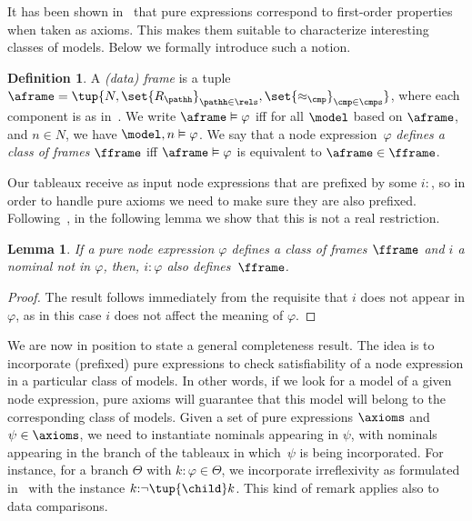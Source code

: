 \documentclass[10pt,a4paper]{amsart}
\newtheorem{lem}[thm]{Lemma}
\theoremstyle{definition}
\newtheorem{defi}[thm]{Definition}
\theoremstyle{remark}
\begin{document}
It has been shown in~\cite{ArecesF21} that pure expressions correspond to first-order properties when taken as axioms. This makes them suitable to characterize interesting classes of models. Below we formally introduce such a notion.

\begin{defi}
    A \emph{(data) frame} is a tuple $\aframe = \tup{N, \set{R_\pathh}_{\pathh \in \rels}, \set{\approx_{\cmp}}_{\cmp\in\cmps}}$, where each component is as in~.
    We write $\aframe\vDash\varphi$ iff for all $\model$ based on $\aframe$, and $n \in N$, we have $\model,n \vDash \varphi$.
    We say that a node expression~$\varphi$ \emph{defines a class of frames $\fframe$} iff $\aframe\vDash\varphi$ is equivalent to  $\aframe\in\fframe$. 
\end{defi}

Our tableaux receive as input node expressions that are prefixed by some $i{:}$, so in order to handle pure axioms we need to make sure they are also prefixed. Following~\cite{Blackburn00,Blackburn2002BeyondPA}, in the following lemma we show that this is not a real restriction.

\begin{lem}\label{lemma:defines}
 If a pure node expression $\varphi$ defines a class of frames $\fframe$ and $i$ a nominal not in $\varphi$, then, $i{:}\varphi$ also defines~$\fframe$.
\end{lem}
\begin{proof}
    The result follows immediately from the requisite that $i$ does not appear in $\varphi$, as in this case $i$ does not affect the meaning of $\varphi$.
\end{proof}

We are now in position to state a general completeness result. The idea is to incorporate (prefixed) pure expressions to check satisfiability of a node expression in a particular class of models. In other words, if we look for a model of a given node expression, pure axioms will guarantee that this model will belong to the corresponding class of models. Given a set of pure expressions $\axioms$ and $\psi\in\axioms$, we need to instantiate nominals appearing in $\psi$, with nominals appearing in the branch of the tableaux in which~$\psi$ is being incorporated. For instance, for a branch $\Theta$ with $k{:}\varphi\in\Theta$, we incorporate irreflexivity as formulated in~ with the instance $k{:}\neg\tup{\child}k$. This kind of remark applies also to data comparisons. 
\end{document}
